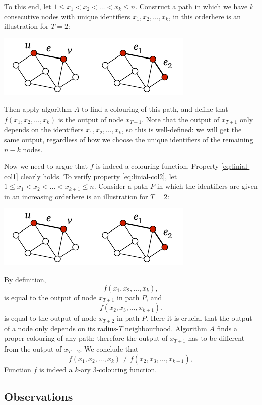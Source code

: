 To this end, let $1 \le x_1 < x_2 < \dotso < x_k \le n$. Construct a path in which we have $k$ consecutive nodes with unique identifiers $x_1, x_2, \dotsc, x_k$, in this order\mydash here is an illustration for $T = 2$:
\begin{center}
    \includegraphics[page=\PIntroIdIncr]{figs.pdf}
\end{center}
Then apply algorithm $A$ to find a colouring of this path, and define that $f(x_1, x_2, \dotsc, x_k)$ is the output of node $x_{T+1}$. Note that the output of $x_{T+1}$ only depends on the identifiers $x_1, x_2, \dotsc,\allowbreak x_k$, so this is well-defined: we will get the same output, regardless of how we choose the unique identifiers of the remaining $n-k$ nodes.

Now we need to argue that $f$ is indeed a colouring function. Property \eqref{eq:linial-col1} clearly holds. To verify property \eqref{eq:linial-col2}, let $1 \le x_1 < x_2 < \dotso < x_{k+1} \le n$. Consider a path $P$ in which the identifiers are given in an increasing order\mydash here is an illustration for $T = 2$:
\begin{center}
    \includegraphics[page=\PIntroIdIncrB]{figs.pdf}
\end{center}
By definition,
\[
    f(x_1, x_2, \dotsc, x_k),
\]
is equal to the output of node $x_{T+1}$ in path $P$, and
\[
    f(x_2, x_3, \dotsc, x_{k+1}).
\]
is equal to the output of node $x_{T+2}$ in path $P$. Here it is crucial that the output of a node only depends on its radius-$T$ neighbourhood. Algorithm $A$ finds a proper colouring of any path; therefore the output of $x_{T+1}$ has to be different from the output of $x_{T+2}$. We conclude that
\[
    f(x_1, x_2, \dotsc, x_k) \ne f(x_2, x_3, \dotsc, x_{k+1}),
\]
Function $f$ is indeed a $k$-ary $3$-colouring function.


\subsection{Observations}


